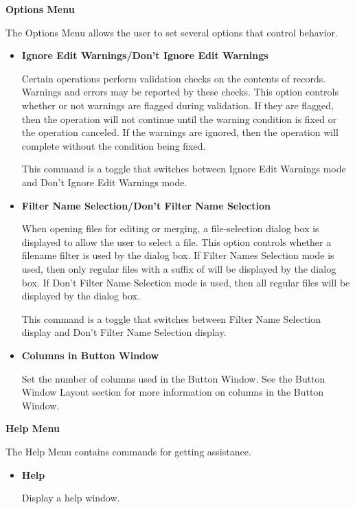 {\bf Options Menu}

The Options Menu allows the user to set several options that control
 behavior.

\begin{itemize}

\item {\bf Ignore Edit Warnings/Don't Ignore Edit Warnings}\verb" "

Certain operations perform validation checks on the contents of
 records.  Warnings and errors may be reported by these
checks.  This option controls whether or not warnings are flagged during
validation.  If they are flagged, then the operation will not continue until
the warning condition is fixed or the operation canceled.  If the warnings are
ignored, then the operation will complete without the condition being fixed.

This command is a toggle that switches between Ignore Edit Warnings mode and
Don't Ignore Edit Warnings mode.

\item {\bf Filter Name Selection/Don't Filter Name Selection}\verb" "

When opening  files for editing or merging, a file-selection
dialog box is displayed to allow the user to select a  file.
This option controls whether a filename filter is used by the dialog box.  If
Filter Names Selection mode is used, then only regular files with a suffix of
 will be displayed by the dialog box.  If Don't Filter Name
Selection mode is used, then all regular files will be displayed by the dialog
box.

This command is a toggle that switches between Filter Name Selection display
and Don't Filter Name Selection display.

\item {\bf Columns in Button Window}\verb" "

Set the number of columns used in the Button Window.  See the Button Window
Layout section for more information on columns in the Button Window.

\end{itemize}

{\bf Help Menu}

The Help Menu contains commands for getting assistance.

\begin{itemize}

\item {\bf Help}\verb" "

Display a help window.

\end{itemize}

